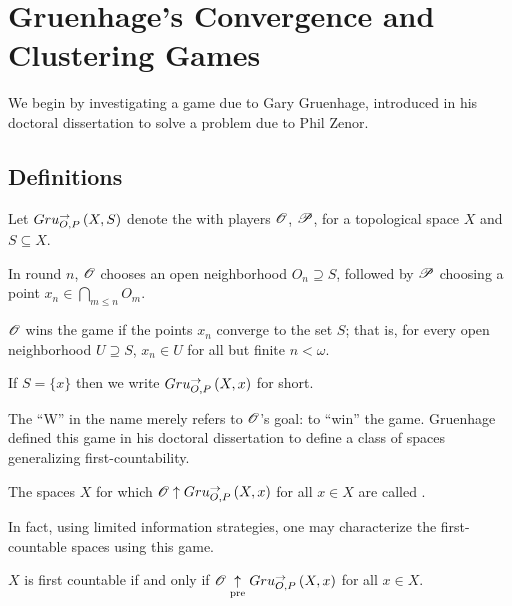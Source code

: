 
\chapter{Gruenhage's Convergence and Clustering Games}

We begin by investigating a game due to Gary Gruenhage, introduced in
his doctoral dissertation to solve a problem due to Phil Zenor.

\section{Definitions}

\begin{game}
  Let $Gru_{O,P}^{\to}\left({X},{S}\right)$ denote the  with
  players $\mathscr{O}$, $\mathscr{P}$, for a topological space $X$ and $S\subseteq X$.

  In round $n$, $\mathscr{O}$ chooses an open neighborhood $O_n\supseteq S$, followed
  by $\mathscr{P}$ choosing a point $x_n\in \bigcap_{m\leq n}O_m$.

  $\mathscr{O}$ wins the game if the points $x_n$ converge to the set $S$; that is,
  for every open neighborhood $U\supseteq S$, $x_n\in U$ for
  all but finite $n<\omega$.

  If $S=\{x\}$ then we write $Gru_{O,P}^{\to}\left({X},{x}\right)$ for short.
\end{game}

The ``W'' in the name merely refers to $\mathscr{O}$'s goal: to ``win'' the game.
Gruenhage defined this game in his doctoral dissertation to define a class
of spaces generalizing first-countability. \cite{MR0413049}

\begin{defn}
  The spaces $X$ for which $\mathscr{O} \uparrow Gru_{O,P}^{\to}\left({X},{x}\right)$ for all $x\in X$ are
  called .
\end{defn}

In fact, using limited information strategies, one may characterize the
first-countable spaces using this game.

\begin{prop}
  $X$ is first countable
    if and only if
  $\mathscr{O} \underset{\text{pre}}{\uparrow} Gru_{O,P}^{\to}\left({X},{x}\right)$ for all $x\in X$.
\end{prop}

